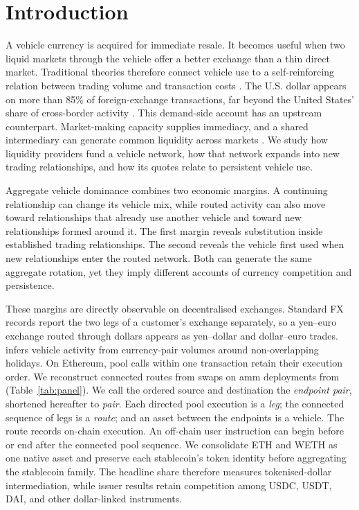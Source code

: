 
\section{Introduction}
\label{sec:intro}

A vehicle currency is acquired for immediate resale. It becomes useful when two liquid markets through the vehicle offer a better exchange than a thin direct market. Traditional theories therefore connect vehicle use to a self-reinforcing relation between trading volume and transaction costs \citep{Krugman1980VehicleCurrencies,KiyotakiWright1989MoneyMedium,FlandreauJobst2009Empirics}. The U.S. dollar appears on more than 85\% of foreign-exchange transactions, far beyond the United States' share of cross-border activity \citep{Somogyi2026DollarDominanceFX}. This demand-side account has an upstream counterpart. Market-making capacity supplies immediacy, and a shared intermediary can generate common liquidity across markets \citep{GrossmanMiller1988Liquidity,CoughenourSaad2004CommonMarketMakers}. We study how liquidity providers fund a vehicle network, how that network expands into new trading relationships, and how its quotes relate to persistent vehicle use.

Aggregate vehicle dominance combines two economic margins. A continuing relationship can change its vehicle mix, while routed activity can also move toward relationships that already use another vehicle and toward new relationships formed around it. The first margin reveals substitution inside established trading relationships. The second reveals the vehicle first used when new relationships enter the routed network. Both can generate the same aggregate rotation, yet they imply different accounts of currency competition and persistence.

These margins are directly observable on decentralised exchanges. Standard FX records report the two legs of a customer's exchange separately, so a yen--euro exchange routed through dollars appears as yen--dollar and dollar--euro trades. \citet{Somogyi2026DollarDominanceFX} infers vehicle activity from currency-pair volumes around non-overlapping holidays. On Ethereum, pool calls within one transaction retain their execution order. We reconstruct connected routes from \RoutePanelRawSwaps{} swaps on \RoutePanelDeploymentCount{} \ac{amm} deployments from \RoutePanelSpan{} (Table~\ref{tab:panel}). We call the ordered source and destination the \emph{endpoint pair}, shortened hereafter to \emph{pair}. Each directed pool execution is a \emph{leg}; the connected sequence of legs is a \emph{route}; and an asset between the endpoints is a vehicle. The route records on-chain execution. An off-chain user instruction can begin before or end after the connected pool sequence. We consolidate ETH and WETH as one native asset and preserve each stablecoin's token identity before aggregating the stablecoin family. The headline share therefore measures tokenised-dollar intermediation, while issuer results retain competition among USDC, USDT, DAI, and other dollar-linked instruments.

